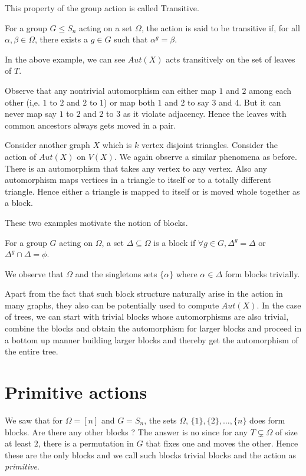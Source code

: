 This property of the group action is called Transitive.
\begin{definition}
	For a group $G \le S_n$ acting on a set $\Omega$, the action is said
	to be transitive if, for all $\alpha, \beta \in \Omega$, there exists
	a $g \in G$ such that $\alpha^g = \beta$.
\end{definition}
In the above example, we can see $Aut(X)$ acts transitively on the set of
leaves of $T$.

Observe that any nontrivial automorphism can either map $1$ and $2$ among
each other (i,e. $1$ to $2$ and $2$ to $1$) or map both $1$ and $2$ to say
$3$ and $4$. But it can never map say $1$ to $2$ and $2$ to $3$ as it violate
adjacency. Hence the leaves with common ancestors always gets moved in a pair.

Consider another graph $X$ which is $k$ vertex disjoint triangles. Consider
the action of $Aut(X)$ on $V(X)$. We again observe a similar phenomena as
before. There is an automorphism that takes any vertex to any vertex. Also
any automorphism maps vertices in a triangle to itself or to a totally 
different triangle. Hence either a triangle is mapped to itself or is moved
whole together as a block.

These two examples motivate the notion of blocks.

\begin{definition}[Blocks]
	For a group $G$ acting on $\Omega$, a set $\Delta \subseteq \Omega$ 
	is a block if $\forall g \in G, \Delta^g = \Delta$ or 
	$\Delta^g \cap \Delta = \phi$.
\end{definition}
We observe that $\Omega$ and the singletons sets $\{\alpha\}$
where $\alpha \in \Delta$ form blocks trivially. 

Apart from the fact that such block structure naturally arise in the action
in many graphs, they also can be potentially used to compute $Aut(X)$. In the
case of trees, we can start with trivial blocks whose automorphisms are also
trivial, combine the blocks and obtain the automorphism for larger blocks and
proceed in a bottom up manner building larger blocks and thereby get the
automorphism of the entire tree.

\section{Primitive actions}
We saw that for $\Omega = [n]$ and $G = S_n$, the sets $\Omega$, $\{1\}, \{2\},
\ldots, \{n\}$ does form blocks. Are there any other blocks ? The answer is
no since for any $T \subsetneq \Omega$ of size at least $2$, there is a
permutation in $G$ that fixes one and moves the other. Hence these are the only
blocks and we call such blocks trivial blocks and the action as
\emph{primitive}.


